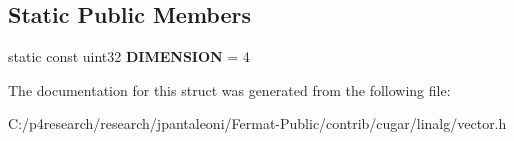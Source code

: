 \subsection*{Static Public Members}
\begin{DoxyCompactItemize}
\item 
\mbox{\label{structcugar_1_1_vector_3_01_t_00_014_01_4_a375e8e000f71f448db265c76b64daa5b}} 
static const uint32 {\bfseries D\+I\+M\+E\+N\+S\+I\+ON} = 4
\end{DoxyCompactItemize}


The documentation for this struct was generated from the following file\+:\begin{DoxyCompactItemize}
\item 
C\+:/p4research/research/jpantaleoni/\+Fermat-\/\+Public/contrib/cugar/linalg/vector.\+h\end{DoxyCompactItemize}

